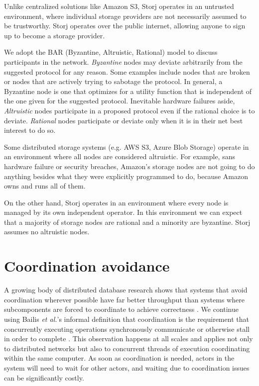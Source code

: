 \documentclass[11pt,fleqn,openany]{book}
\begin{document}
Unlike centralized solutions like Amazon S3, Storj operates in an untrusted
environment, where individual storage providers are not necessarily assumed to be
trustworthy. Storj operates over the public internet, allowing anyone to sign
up to become a storage provider.

We adopt the BAR (Byzantine, Altruistic, Rational) model \cite{bar} to discuss
participants in the network.
{\em Byzantine} nodes may deviate arbitrarily from the suggested protocol for
any reason. Some examples include nodes that are broken or nodes that
are actively trying to sabotage the protocol. In general, a Byzantine node is
one that optimizes for a utility function that is independent of the one
given for the suggested protocol.
Inevitable hardware failures aside, {\em Altruistic} nodes
participate in a proposed protocol even if the rational choice is to deviate.
{\em Rational} nodes participate or deviate only when it
is in their net best interest to do so.

Some distributed storage systems (e.g. AWS S3, Azure Blob Storage)
operate in an environment
where all nodes are considered altruistic. For example, sans hardware failure
or security breaches, Amazon's storage nodes
are not going to do anything besides what they were explicitly programmed to do,
because Amazon owns and runs all of them.

On the other hand, Storj operates in an environment where every node is
managed by its own independent operator.
In this environment we can expect that a majority
of storage nodes are rational and a minority are byzantine. Storj assumes no
altruistic nodes.

\section{Coordination avoidance}\label{sec:coordination-avoidance}

A growing body of distributed database research shows that systems that
avoid coordination wherever possible have far better throughput than systems
where subcomponents are forced to coordinate to achieve correctness
\cite{cap1, cap2, consistency-vs-latency, hat, i-confluence, anna,
calm1, calm2}.
We continue using Bailis {\em et al.}'s informal definition
that coordination is the requirement that concurrently executing operations
synchronously communicate or otherwise stall in order to complete
\cite{i-confluence}.
This observation happens at all scales and applies not only to distributed
networks but also to
concurrent threads of execution coordinating within the same computer.
As soon as coordination is needed, actors in the system will need to wait for
other actors, and waiting due to coordination issues can be significantly
costly.
\end{document}
